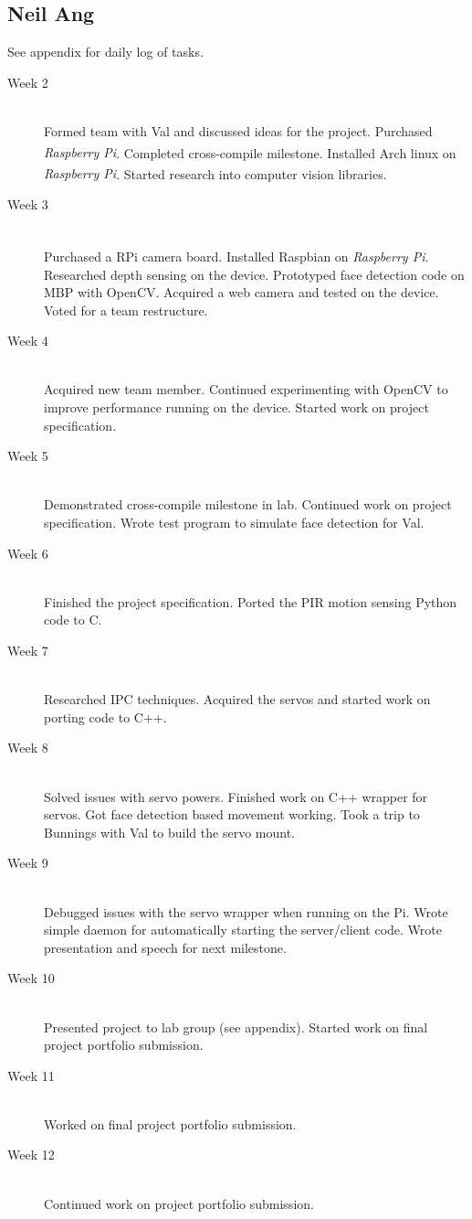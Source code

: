 \documentclass[11pt,a4paper,titlepage]{report}
\newcommand{\rpi}{\textit{Raspberry Pi\textsuperscript{\textregistered}}}
\begin{document}
\subsection{Neil Ang}

See appendix for daily log of tasks.

\begin{description}

  \item[Week 2] \hfill \\
      Formed team with Val and discussed ideas for the project. Purchased \rpi. Completed cross-compile milestone. Installed Arch linux on \rpi. Started research into computer vision libraries.
  \item[Week 3] \hfill \\
      Purchased a RPi camera board. Installed Raspbian on \rpi. Researched depth sensing on the device. Prototyped face detection code on MBP with OpenCV. Acquired a web camera and tested on the device. Voted for a team restructure.
  \item[Week 4] \hfill \\
      Acquired new team member. Continued experimenting with OpenCV to improve performance running on the device. Started work on project specification.
  \item[Week 5] \hfill \\
      Demonstrated cross-compile milestone in lab. Continued work on project specification. Wrote test program to simulate face detection for Val.
  \item[Week 6] \hfill \\
      Finished the project specification. Ported the PIR motion sensing Python code to C.
  \item[Week 7] \hfill \\
      Researched IPC techniques. Acquired the servos and started work on porting code to C++.
  \item[Week 8] \hfill \\
      Solved issues with servo powers. Finished work on C++ wrapper for servos. Got face detection based movement working. Took a trip to Bunnings with Val to build the servo mount.
  \item[Week 9] \hfill \\
      Debugged issues with the servo wrapper when running on the Pi. Wrote simple daemon for automatically starting the server/client code. Wrote presentation and speech for next milestone.
  \item[Week 10] \hfill \\
      Presented project to lab group (see appendix). Started work on final project portfolio submission.
  \item[Week 11] \hfill \\
      Worked on final project portfolio submission.
  \item[Week 12] \hfill \\
      Continued work on project portfolio submission.

\end{description}
\end{document}
